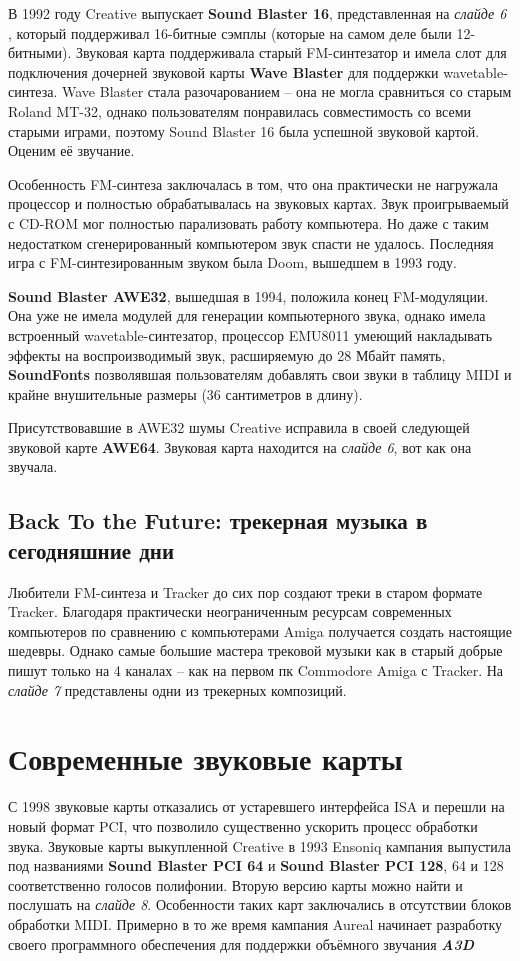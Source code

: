 \documentclass[a4paper,12pt]{extarticle}
\begin{document}
	В 1992 году Creative выпускает \textbf{Sound Blaster 16}, представленная на \textit{слайде 6} , который поддерживал 16-битные сэмплы (которые на самом деле были 12-битными). Звуковая карта поддерживала старый FM-синтезатор и имела слот для подключения дочерней звуковой карты \textbf{Wave Blaster} для поддержки wavetable-синтеза. Wave Blaster стала разочарованием – она не могла сравниться со старым Roland MT-32, однако пользователям понравилась совместимость со всеми старыми играми, поэтому Sound Blaster 16 была успешной звуковой картой. Оценим её звучание.
	
	Особенность FM-синтеза заключалась в том, что она практически не нагружала процессор и полностью обрабатывалась на звуковых картах. Звук проигрываемый с CD-ROM мог полностью парализовать работу компьютера. Но даже с таким недостатком сгенерированный компьютером звук спасти не удалось. Последняя игра с FM-синтезированным звуком была Doom, вышедшем в 1993 году.
	
	\textbf{Sound Blaster AWE32}, вышедшая в 1994, положила конец FM-модуляции. Она уже не имела модулей для генерации компьютерного звука, однако имела встроенный wavetable-синтезатор, процессор EMU8011 умеющий накладывать эффекты на воспроизводимый звук, расширяемую до 28 Мбайт память, \textbf{SoundFonts} позволявшая пользователям добавлять свои звуки в таблицу MIDI и крайне внушительные размеры (36 сантиметров в длину). 
	
	Присутствовавшие в AWE32 шумы Creative исправила в своей следующей звуковой карте \textbf{AWE64}. Звуковая карта находится на \textit{слайде 6}, вот как она звучала.
	
	\subsection{Back To the Future: трекерная музыка в сегодняшние дни}
	Любители FM-синтеза и Tracker до сих пор создают треки в старом формате Tracker. Благодаря практически неограниченным ресурсам современных компьютеров по сравнению с компьютерами Amiga получается создать настоящие шедевры. Однако самые большие мастера трековой музыки как в старый добрые пишут только на 4 каналах – как на первом пк Commodore Amiga с Tracker. На \textit{слайде 7} представлены одни из трекерных композиций.
	
	
	\section{Современные звуковые карты}
	С 1998 звуковые карты отказались от устаревшего интерфейса ISA и перешли на новый формат PCI, что позволило существенно ускорить процесс обработки звука. Звуковые карты выкупленной Creative в 1993 Ensoniq кампания выпустила под названиями \textbf{Sound Blaster PCI 64} и \textbf{Sound Blaster PCI 128}, 64 и 128 соответственно голосов полифонии. Вторую версию карты можно найти и послушать на \textit{слайде 8}. Особенности таких карт заключались в отсутствии блоков обработки MIDI. Примерно в то же время кампания Aureal начинает разработку своего программного обеспечения для поддержки объёмного звучания \textbf{\textit{A3D}}
	
\end{document}
